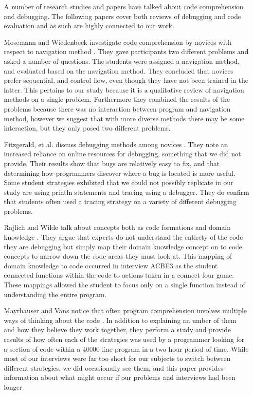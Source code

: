 \documentclass{article}
\begin{document}
A number of research studies and papers have talked about code comprehension and debugging.
The following papers cover both reviews of debugging and code evaluation and as such are highly connected to our work. 

Mosemann and Wiedenbeck investigate code comprehension by novices with respect to navigation method \cite{mosemann2001}.
They gave participants two different problems and asked a number of questions.
The students were assigned a navigation method, and evaluated based on the navigation method.
They concluded that novices prefer sequential, and control flow, even though they have not been trained in the latter.
This pertains to our study because it is a qualitative review of navigation methods on a single problem.
Furthermore they combined the results of the problems because there was no interaction between program and navigation method,
	however we suggest that with more diverse methods there may be some interaction, but they only posed two different problems.
	
Fitzgerald, et al. discuss debugging methods among novices \cite{fitzgerald2008}.
They note an increased reliance on online resources for debugging, something that we did not provide.
Their results show that bugs are relatively easy to fix, and that determining how programmers discover where a bug is located is more useful.
Some student strategies exhibited that we could not possibly replicate in our study are using println statements and tracing using a debugger.
They do confirm that students often used a tracing strategy on a variety of different debugging problems.

Rajlich and Wilde talk about concepts both as code formations and domain knowledge \cite{1021348}.
They argue that experts do not understand the entirety of the code they are debugging but simply map their domain knowledge concept on to code concepts to narrow down the code areas they must look at.
This mapping of domain knowledge to code occurred in interview ACBE3 as the student connected functions within the code to actions taken in a connect four game.
These mappings allowed the student to focus only on a single function instead of understanding the entire program.

Mayrhauser and Vans notice that often program comprehension involves multiple ways of thinking about the code \cite{402076}.
In addition to explaining an umber of them and how they believe they work together,
	they perform a study and provide results of how often each of the strategies was used by a programmer looking for a section of code within a 40000 line program in a two hour period of time.
While most of our interviews were far too short for our subjects to switch between different strategies,
	we did occasionally see them, and this paper provides information about what might occur if our problems and interviews had been longer. 
\end{document}
